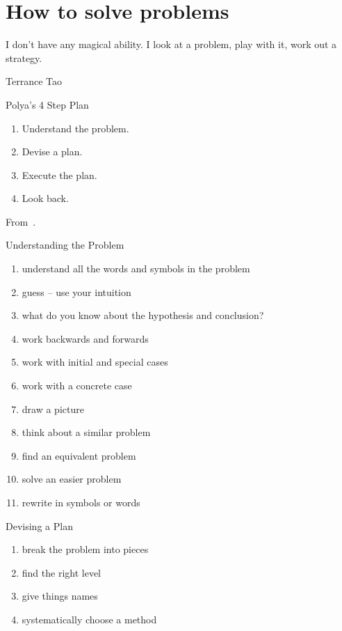 \documentclass[12pt]{book}
\begin{document}
\chapter{How to solve problems}
\epigraph{I don't have any magical ability. I look at a problem, play with it,
	work out a strategy.} {Terrance Tao}
\begin{definition}{Polya's 4 Step Plan}{}
	\begin{enumerate}[label = {(\roman*)}]
		\item Understand the problem.
		\item Devise a plan.
		\item Execute the plan.
		\item Look back.
	\end{enumerate}
	From~\cite{polya2014}.
\end{definition}

\begin{definition}{Understanding the Problem}{}
	\begin{enumerate}[label = {(\alph*)}]
		\item understand all the words and symbols in the problem
		\item guess – use your intuition
		\item what do you know about the hypothesis and conclusion?
		\item work backwards and forwards
		\item work with initial and special cases
		\item work with a concrete case
		\item draw a picture
		\item think about a similar problem
		\item find an equivalent problem
		\item solve an easier problem
		\item rewrite in symbols or words
	\end{enumerate}
\end{definition}

\begin{definition}{Devising a Plan}{}
	\begin{enumerate}[label = {(\alph*)}]
		\item break the problem into pieces
		\item find the right level
		\item give things names
		\item systematically choose a method
	\end{enumerate}
\end{definition}
\end{document}
